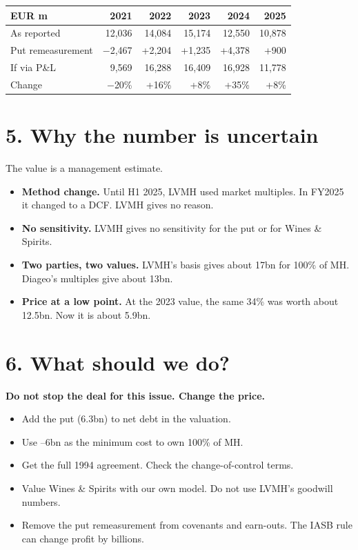 \documentclass[11pt,a4paper]{article}
\begin{document}
\begin{center}
\small
\begin{tabular}{@{}lrrrrr@{}}
\toprule
EUR m & 2021 & 2022 & 2023 & 2024 & 2025 \\
\midrule
As reported & 12,036 & 14,084 & 15,174 & 12,550 & 10,878 \\
Put remeasurement & $-$2,467 & +2,204 & +1,235 & +4,378 & +900 \\
If via P\&L & 9,569 & 16,288 & 16,409 & 16,928 & 11,778 \\
Change & $-$20\% & +16\% & +8\% & +35\% & +8\% \\
\bottomrule
\end{tabular}
\end{center}

\section*{5. Why the number is uncertain}
The value is a management estimate.
\begin{itemize}
  \item \textbf{Method change.} Until H1 2025, LVMH used market multiples. In FY2025 it changed to a DCF. LVMH gives no reason.
  \item \textbf{No sensitivity.} LVMH gives no sensitivity for the put or for Wines \& Spirits.
  \item \textbf{Two parties, two values.} LVMH's basis gives about \texteuro17bn for 100\% of MH. Diageo's multiples give about \texteuro13bn.
  \item \textbf{Price at a low point.} At the 2023 value, the same 34\% was worth about \texteuro12.5bn. Now it is about \texteuro5.9bn.
\end{itemize}

\section*{6. What should we do?}
\textbf{Do not stop the deal for this issue. Change the price.}
\begin{itemize}
  \item Add the put (\texteuro6.3bn) to net debt in the valuation.
  \item Use --6bn as the minimum cost to own 100\% of MH.
  \item Get the full 1994 agreement. Check the change-of-control terms.
  \item Value Wines \& Spirits with our own model. Do not use LVMH's goodwill numbers.
  \item Remove the put remeasurement from covenants and earn-outs. The IASB rule can change profit by billions.
\end{itemize}
\end{document}
